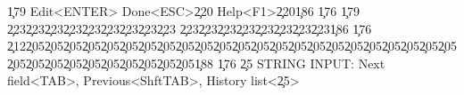                       \c{179} Edit<ENTER> Done<ESC>\c{220} Help<F1>\c{220}\c{186}                      \c{176}
                      \c{179}              \c{223}\c{223}\c{223}\c{223}\c{223}\c{223}\c{223}\c{223}\c{223}  \c{223}\c{223}\c{223}\c{223}\c{223}\c{223}\c{223}\c{223}\c{186}                      \c{176}
                      \c{212}\c{205}\c{205}\c{205}\c{205}\c{205}\c{205}\c{205}\c{205}\c{205}\c{205}\c{205}\c{205}\c{205}\c{205}\c{205}\c{205}\c{205}\c{205}\c{205}\c{205}\c{205}\c{205}\c{205}\c{205}\c{205}\c{205}\c{205}\c{205}\c{205}\c{205}\c{205}\c{205}\c{205}\c{188}                      \c{176}
                                                                               \c{25}
STRING INPUT: Next field<TAB>, Previous<ShftTAB>, History list<\c{25}>               
                                                                                
